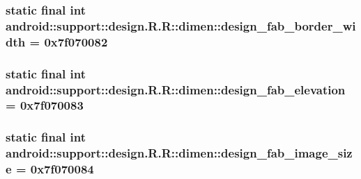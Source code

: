 \hypertarget{classandroid_1_1support_1_1design_1_1_r_1_1dimen_be35baa7b9abcb88bc0a7a27b5375f47}{
\subsubsection[{design\_\-fab\_\-border\_\-width}]{\setlength{\rightskip}{0pt plus 5cm}static final int android::support::design.R.R::dimen::design\_\-fab\_\-border\_\-width = 0x7f070082}}
\label{classandroid_1_1support_1_1design_1_1_r_1_1dimen_be35baa7b9abcb88bc0a7a27b5375f47}


\hypertarget{classandroid_1_1support_1_1design_1_1_r_1_1dimen_67660b5f7a7faff4f34213382b53666c}{
\subsubsection[{design\_\-fab\_\-elevation}]{\setlength{\rightskip}{0pt plus 5cm}static final int android::support::design.R.R::dimen::design\_\-fab\_\-elevation = 0x7f070083}}
\label{classandroid_1_1support_1_1design_1_1_r_1_1dimen_67660b5f7a7faff4f34213382b53666c}


\hypertarget{classandroid_1_1support_1_1design_1_1_r_1_1dimen_9e06c83c42ce7bc027fd715c88f5fa81}{
\subsubsection[{design\_\-fab\_\-image\_\-size}]{\setlength{\rightskip}{0pt plus 5cm}static final int android::support::design.R.R::dimen::design\_\-fab\_\-image\_\-size = 0x7f070084}}
\label{classandroid_1_1support_1_1design_1_1_r_1_1dimen_9e06c83c42ce7bc027fd715c88f5fa81}


